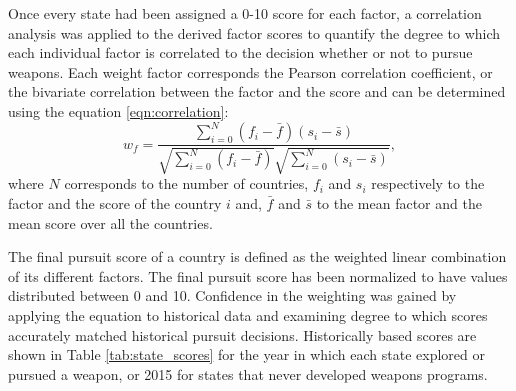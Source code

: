 Once every state had been assigned a 0-10 score for each factor, a correlation
analysis was applied to the derived factor scores to quantify the degree to
which each individual factor is correlated to the decision whether or not to
pursue weapons.
Each weight factor corresponds the Pearson correlation coefficient, or
the bivariate correlation between the factor and the score and can be
determined using the equation \ref{eqn:correlation}:
\begin{equation}
    \label{eqn:correlation}
    w_{f} = \frac{\sum_{i=0}^{N} (f_{i} - \bar{f}) (s_{i} - \bar{s})}
                 {\sqrt{\sum_{i=0}^{N}\left(f_{i} - \bar{f}\right)}
                 \sqrt{\sum_{i=0}^{N}\left(s_{i} - \bar{s}\right)}},
\end{equation}
where $N$ corresponds to the number of countries, $f_{i}$ and $s_{i}$ respectively
to the factor and the score of the country $i$ and, $\bar{f}$ and $\bar{s}$ to
the mean factor and the mean score over all the countries.

The final pursuit score of a country is defined as the weighted linear combination of
its different factors. The final pursuit score has been normalized to have
values distributed between 0 and 10. Confidence in the weighting was gained by applying the equation to historical data and examining degree to which scores accurately matched historical pursuit decisions.  Historically based scores are shown in Table \ref{tab:state_scores} for the year in which each state explored or pursued a weapon, or 2015 for states that never developed weapons programs.


